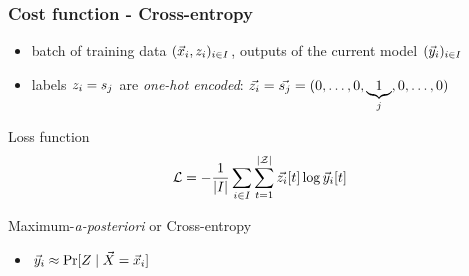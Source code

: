 \begin{frame}
\frametitle{Cost function - Cross-entropy}
\vspace*{-3pt}
\begin{itemize}
\item batch of training data $(\vec{x}_i, z_i)_{i\in I}$, outputs of the current model $(\vec{y}_i)_{i\in I}$
\item labels $z_i=s_{j}$ are \emph{one-hot encoded}: $\vec{z_i} = \vec{s_{j}} = (0,\ldots , 0,\underbrace{1}_{j},0,\dots,0)$
\end{itemize}

\begin{block}{Loss function}
\begin{equation}\label{eq:lossfunction}
\mathcal{L} = -\frac{1}{\lvert I \rvert} \sum_{i\in I} \sum_{t=1}^{|\mathcal{Z}|}\vec{z_i}[t]\log{\ensuremath {\vec{y}}_i[t]}
\end{equation}   
\end{block}

\begin{block}{Maximum-\emph{a-posteriori} or Cross-entropy}
\begin{itemize}
\item $\vNNOutput_i \approx \prob[\given{\sensRandVar}{\vaLeakVec=\vLeakVec_i}]$
\end{itemize}
\end{block}
\end{frame}

